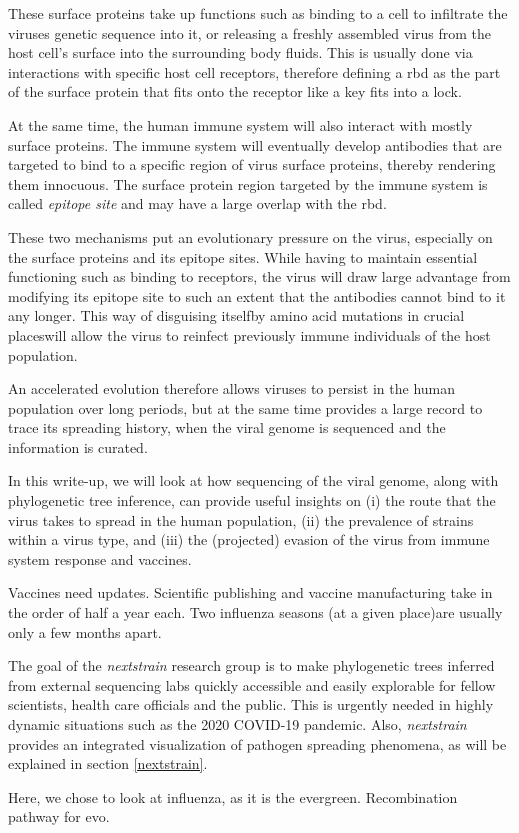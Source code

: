 \documentclass[12pt]{scrartcl}
\newcommand{\red}[1]{{\color{red}#1}}
\begin{document}
{      These surface proteins take up functions such as binding to a cell to infiltrate the viruses genetic sequence into it, or releasing a freshly assembled virus from the host cell's surface into the surrounding body fluids. This is usually done via interactions with specific host cell receptors, therefore defining a \acrfull{rbd} as the part of the surface protein that fits onto the receptor like a key fits into a lock.

      At the same time, the human immune system will also interact with mostly surface proteins. The immune system will eventually develop antibodies that are targeted to bind to a specific region of virus surface proteins, thereby rendering them innocuous. The surface protein region targeted by the immune system is called \textit{epitope site} and may have a large overlap with the \acrshort{rbd}.

      These two mechanisms put an evolutionary pressure on the virus, especially on the surface proteins and its epitope sites. While having to maintain essential functioning such as binding to receptors, the virus will draw large advantage from modifying its epitope site to such an extent that the antibodies cannot bind to it any longer. This way of disguising itself\textemdash by amino acid mutations in crucial places\textemdash will allow the virus to reinfect previously immune individuals of the host population.

      An accelerated evolution therefore allows viruses to persist in the human population over long periods, but at the same time provides a large record to trace its spreading history, when the viral genome is sequenced and the information is curated.

      In this write-up, we will look at how sequencing of the viral genome, along with phylogenetic tree inference, can provide useful insights on (i) the route that the virus takes to spread in the human population, (ii) the prevalence of strains within a virus type, and (iii) the (projected) evasion of the virus from immune system response and vaccines.

      \red{Vaccines need updates. Scientific publishing and vaccine manufacturing take in the order of half a year each. Two influenza seasons (at a given place)are usually only a few months apart.}

      The goal of the \textit{nextstrain} research group is to make phylogenetic trees inferred from external sequencing labs quickly accessible and easily explorable for fellow scientists, health care officials and the public. This is urgently needed in highly dynamic situations such as the 2020 COVID-19 pandemic. Also, \textit{nextstrain} provides an integrated visualization of pathogen spreading phenomena, as will be explained in section \ref{nextstrain}.

      Here, we chose to look at influenza, as it is the evergreen. \red{Recombination pathway for evo.}

    } %
\end{document}
